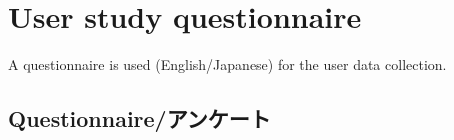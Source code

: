 
\chapter{User study questionnaire} %

\label{AppendixD} %


A questionnaire is used (English/Japanese) for the user data collection.  
\section*{Questionnaire/アンケート}


